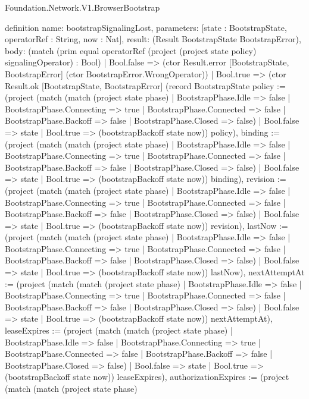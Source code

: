 \begin{lexlean}{Foundation.Network.V1.BrowserBootstrap}
\begin{semanticmodule}
definition{
  name: bootstrapSignalingLost,
  parameters: [state : BootstrapState, operatorRef : String, now : Nat],
  result: (Result BootstrapState BootstrapError),
  body: (match (prim equal operatorRef (project (project state policy) signalingOperator) : Bool)
    | Bool.false => (ctor Result.error [BootstrapState, BootstrapError] (ctor BootstrapError.WrongOperator))
    | Bool.true => (ctor Result.ok [BootstrapState, BootstrapError] (record BootstrapState {policy := (project (match (match (project state phase)
        | BootstrapPhase.Idle => false
        | BootstrapPhase.Connecting => true
        | BootstrapPhase.Connected => false
        | BootstrapPhase.Backoff => false
        | BootstrapPhase.Closed => false)
      | Bool.false => state
      | Bool.true => (bootstrapBackoff state now)) policy), binding := (project (match (match (project state phase)
        | BootstrapPhase.Idle => false
        | BootstrapPhase.Connecting => true
        | BootstrapPhase.Connected => false
        | BootstrapPhase.Backoff => false
        | BootstrapPhase.Closed => false)
      | Bool.false => state
      | Bool.true => (bootstrapBackoff state now)) binding), revision := (project (match (match (project state phase)
        | BootstrapPhase.Idle => false
        | BootstrapPhase.Connecting => true
        | BootstrapPhase.Connected => false
        | BootstrapPhase.Backoff => false
        | BootstrapPhase.Closed => false)
      | Bool.false => state
      | Bool.true => (bootstrapBackoff state now)) revision), lastNow := (project (match (match (project state phase)
        | BootstrapPhase.Idle => false
        | BootstrapPhase.Connecting => true
        | BootstrapPhase.Connected => false
        | BootstrapPhase.Backoff => false
        | BootstrapPhase.Closed => false)
      | Bool.false => state
      | Bool.true => (bootstrapBackoff state now)) lastNow), nextAttemptAt := (project (match (match (project state phase)
        | BootstrapPhase.Idle => false
        | BootstrapPhase.Connecting => true
        | BootstrapPhase.Connected => false
        | BootstrapPhase.Backoff => false
        | BootstrapPhase.Closed => false)
      | Bool.false => state
      | Bool.true => (bootstrapBackoff state now)) nextAttemptAt), leaseExpires := (project (match (match (project state phase)
        | BootstrapPhase.Idle => false
        | BootstrapPhase.Connecting => true
        | BootstrapPhase.Connected => false
        | BootstrapPhase.Backoff => false
        | BootstrapPhase.Closed => false)
      | Bool.false => state
      | Bool.true => (bootstrapBackoff state now)) leaseExpires), authorizationExpires := (project (match (match (project state phase)
}}
\end{semanticmodule}
\end{lexlean}
